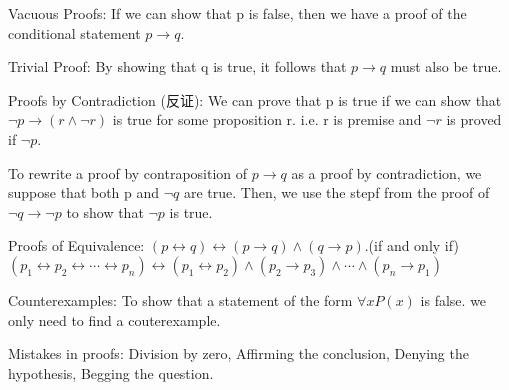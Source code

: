 \documentclass[none,green,normal,cn]{elegantnote}
\begin{document}
Vacuous Proofs: If we can show that p is false, then we have a proof of the conditional statement \(p \rightarrow q\).

Trivial Proof: By showing that q is true, it follows that \(p \rightarrow q\) must also be true.

Proofs by Contradiction (反证): We can prove that p is true if we can show that \(\neg p \rightarrow (r \wedge \neg r)\) is true for some proposition r. i.e. r is premise and \(\neg r\) is proved if \(\neg p\).

To rewrite a proof by contraposition of \(p \rightarrow q \) as a proof by contradiction, we suppose that both p and \(\neg q\) are true. Then, we use the stepf from the proof of \(\neg q \rightarrow \neg p\) to show that \(\neg p \) is true.

Proofs of Equivalence: \((p \leftrightarrow q) \leftrightarrow (p \rightarrow q) \wedge (q \rightarrow p)\).(if and only if)
\((p_1 \leftrightarrow p_2 \leftrightarrow \cdots \leftrightarrow p_n) \leftrightarrow (p_1 \leftrightarrow p_2) \wedge (p_2 \rightarrow p_3) \wedge \cdots \wedge (p_n \rightarrow p_1)\)

Counterexamples: To show that a statement of the form \(\forall xP(x)\) is false. 
we only need to find a couterexample.

Mistakes in proofs: Division by zero, Affirming the conclusion, Denying the hypothesis, Begging the question.
\end{document}
